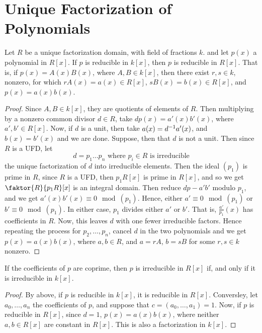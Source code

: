 \section{Unique Factorization of Polynomials}
\label{section_7.2}

\begin{proposition}[Gauss]\label{proposition_7.2.1}
  Let $R$ be a unique factorization domain, with field of fractions $k$. and let
  $p(x)$ a polynomial in $R[x]$. If $p$ is reducible in $k[x]$, then $p$ is
  reducible in  $R[x]$. That is, if $p(x)=A(x)B(x)$, where $A,B \in k[x]$,
  then there exist $r,s \in k$, nonzero, for which  $rA(x)=a(x) \in R[x]$,
  $sB(x)=b(x) \in R[x]$, and $p(x)=a(x)b(x)$.
\end{proposition}
\begin{proof}
  Since $A,B \in k[x]$, they are quotients of elements of $R$. Then
  multiplying by a nonzero common divisor  $d \in R$, take  $dp(x)=a'(x)b'(x)$,
  where $a',b' \in R[x]$. Now, if $d$ is a unit, then take
  $a(x)=d^{-1}a'(x)$, and $b(x)=b'(x)$ and we are done. Suppose, then that
  $d$ is not a unit. Then since  $R$ is a UFD, let
  \begin{equation*}
    d=p_1 \dots p_n \text{ where } p_i \in R \text{ is irreducible}
  \end{equation*}
  the unique factorization of $d$ into irreducible elements. Then the ideal
  $(p_1)$ is prime in $R$, since  $R$ is a UFD, then  $p_1R[x]$ is prime in
  $R[x]$, and so we get $\faktor{R}{p_1R}[x]$ is an integral domain. Then
  reduce $dp-a'b'$ modulo  $p_1$, and we get $a'(x)b'(x) \equiv 0
  \mod{(p_1)}$. Hence, either $a' \equiv 0 \mod{(p_1)}$ or $b' \equiv 0
  \mod{(p_1)}$. In either case, $p_1$ divides either $a'$ or  $b'$. That is,
  $\frac{a'}{p_1}(x)$ has coefficients in $R$. Now, this leaves  $d$ with one
  fewer irreducible factors. Hence repeating the process for  $p_2, \dots,
  p_n$, cancel $d$ in the two polynomials and we get  $p(x)=a(x)b(x)$, where
  $a,b \in R$, and  $a=rA$,  $b=sB$ for some  $r,s \in k$ nonzero.
\end{proof}
\begin{corollary}
  If the coefficients of $p$ are coprime, then  $p$ is irreducible in  $R[x]$
  if, and only if it is irreducible in $k[x]$.
\end{corollary}
\begin{proof}
  By above, if $p$ is reducible in $k[x]$, it is reducible in $R[x]$.
  Conversley, let $a_0, \dots, a_n$ the coefficients of $p$, and suppose that
  $c=(a_0, \dots, a_1)=1$. Now, if $p$ is reducible in $R[x]$, since $d=1$,
  $p(x)=a(x)b(x)$, where neither $a,b \in R[x]$ are constant in $R[x]$. This
  is also a factorization in $k[x]$.
\end{proof}

